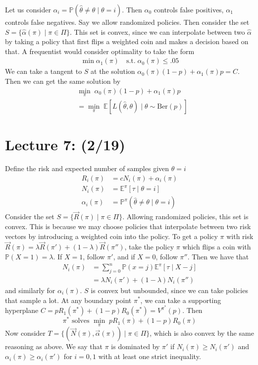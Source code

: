 \documentclass[pdftex,letterpaper,11pt]{article}
\theoremstyle{definition}
\theoremstyle{definition}
\theoremstyle{definition}
\newcommand{\PP}{\mathbb P}
\newcommand{\EE}{\mathbb E}
\newcommand{\mrm}[1]{\mathrm{#1}}
\begin{document}
Let us consider $\alpha_i = \PP(\hat \theta \neq \theta \mid \theta=i)$. Then $\alpha_0$ controls false positives, $\alpha_1$ controls false negatives. Say we allow randomized policies. Then consider the set $S = \{\hat \alpha(\pi) \mid \pi \in \Pi\}$. This set is convex, since we can interpolate between two $\hat \alpha$ by taking a policy that first flips a weighted coin and makes a decision based on that. A frequentist would consider optimality to take the form
\begin{align*}
	\min \alpha_1(\pi) \quad \mrm{s.t.} \; \alpha_0(\pi) \leq .05
\end{align*}
We can take a tangent to $S$ at the solution $\alpha_0(\pi)(1-p) + \alpha_1(\pi)p = C$. Then we can get the same solution by
\begin{align*}
	& \min_\pi \; \alpha_0(\pi)(1-p) + \alpha_1(\pi)p\\
	& = \min_\pi \; \EE[L(\hat \theta, \theta) \mid \theta \sim \mrm{Ber}(p)]
\end{align*}


\section*{Lecture 7: (2/19)}

Define the risk and expected number of samples given $\theta = i$
\begin{align*}
	R_i(\pi) & = cN_i(\pi) + \alpha_i(\pi)\\
	N_i(\pi) & = \EE^\pi[\tau \mid \theta=i]\\
	\alpha_i(\pi) & = \PP^\pi(\hat \theta \neq \theta \mid \theta = i)
\end{align*}
Consider the set $S = \{ \vec R(\pi) \mid \pi \in \Pi \}$. Allowing randomized policies, this set is convex. This is because we may choose policies that interpolate between two risk vectors by introducing a weighted coin into the policy. To get a policy $\pi$ with risk $\vec R(\pi) = \lambda \vec R(\pi') + (1-\lambda) \vec R(\pi '')$, take the policy $\pi$ which flips a coin with $\PP(X = 1) = \lambda$. If $X = 1$, follow $\pi'$, and if $X = 0$, follow $\pi''$. Then we have that
\begin{align*}
	N_i(\pi) & = \sum_{j=0}^n \PP(x=j) \EE^\pi[\tau \mid X-j]\\
	& = \lambda N_i(\pi') + (1-\lambda) N_i(\pi'')
\end{align*}
and similarly for $\alpha_i(\pi)$. $S$ is convex but unbounded, since we can take policies that sample a lot. At any boundary point $\pi^*$, we can take a supporting hyperplane $C = pR_1(\pi^*) + (1-p)R_0(\pi^*) = V^{\pi^*}(p)$. Then
\[\mbox{$\pi^*$ solves } \min_\pi\; pR_1(\pi) + (1-p)R_0(\pi)\]
Now consider $T = \{(\vec N(\pi), \vec \alpha(\pi)) \mid \pi \in \Pi \}$, which is also convex by the same reasoning as above. We say that $\pi$ is dominated by $\pi'$ if $N_i(\pi) \geq N_i(\pi')$ and $\alpha_i(\pi) \geq \alpha_i(\pi')$ for $i=0,1$ with at least one strict inequality.
\end{document}
